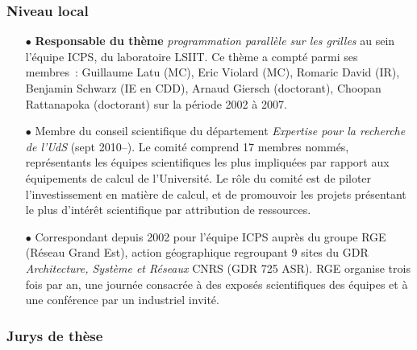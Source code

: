 \subsubsection{Niveau local}
\begin{itemize}


\item[$\bullet$]
\textbf{Responsable du thème} \emph{programmation parallèle sur les grilles} au sein l'équipe ICPS,
du laboratoire LSIIT. Ce thème a compté parmi ses membres~: Guillaume Latu (MC), 
Eric Violard (MC), Romaric David (IR), Benjamin Schwarz (IE en CDD), Arnaud Giersch (doctorant), 
Choopan Rattanapoka (doctorant) sur la période 2002 à 2007.\\

\item [$\bullet$]
Membre du conseil scientifique du département \emph{Expertise pour la recherche de l'UdS} (sept 2010--).
Le comité comprend 17 membres nommés, représentants les équipes scientifiques les plus impliquées
par rapport aux équipements de calcul de l'Université. Le rôle du comité est de piloter
l'investissement en matière de calcul, et de promouvoir les projets présentant le plus
d'intérêt scientifique par attribution de ressources.\\

\item[$\bullet$]
Correspondant depuis 2002 pour l'équipe ICPS auprès du groupe RGE (Réseau Grand Est),
action géographique regroupant 9 sites du GDR \textit{Architecture, Système et Réseaux} 
CNRS (GDR 725 ASR). RGE organise trois fois par an, une journée consacrée à des exposés 
scientifiques des équipes et à une conférence par un industriel invité.\\


\end{itemize}

\subsubsection{Jurys de thèse}


